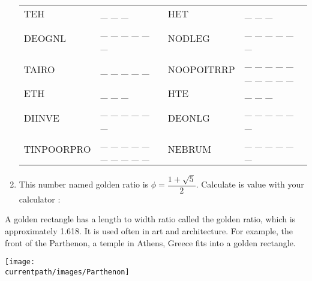\begin{enigme}
\begin{enumerate}
      \begin{center}
         \renewcommand{\arraystretch}{1.2}
         \begin{tabular}{|p{3cm}p{4cm}|p{3cm}p{4cm}|}
            \hline
            TEH & \_ \_ \_ & HET & \_ \_ \_ \\
            DEOGNL & \_ \_ \_ \_ \_ \_ & NODLEG & \_ \_ \_ \_ \_ \_ \\
            TAIRO & \_ \_ \_ \_ \_ & NOOPOITRRP & \_ \_ \_ \_ \_ \_ \_ \_ \_ \_ \\
            \hline
            ETH & \_ \_ \_ & HTE & \_ \_ \_ \\
            DIINVE & \_ \_ \_ \_ \_ \_ & DEONLG & \_ \_ \_ \_ \_ \_ \\
            TINPOORPRO & \_ \_ \_ \_ \_ \_ \_ \_ \_ \_ & NEBRUM & \_ \_ \_ \_ \_ \_ \\
            \hline
         \end{tabular}
      \end{center}
      \smallskip
      \item This number named golden ratio is $\phi =\dfrac{1+\sqrt5}{2}$. Calculate is value with your calculator : \pointilles
   \end{enumerate}
   
   \vfill
   
   \begin{minipage}{10cm}
      A golden rectangle has a length to width ratio called the golden ratio, which is approximately 1.618. It is used often in art and architecture. For example, the front of the Parthenon, a temple in Athens, Greece fits into a golden rectangle.
   \end{minipage}
   \qquad
   \begin{minipage}{5cm}
      \texttt{[image: \\currentpath/images/Parthenon]}
   \end{minipage}
\end{enigme}


